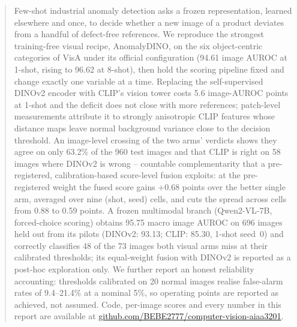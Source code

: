 \begin{abstract}
Few-shot industrial anomaly detection asks a frozen representation, learned elsewhere and
once, to decide whether a new image of a product deviates from a handful of defect-free
references. We reproduce the strongest training-free visual recipe, AnomalyDINO, on the six
object-centric categories of VisA under its official configuration (94.61 image AUROC at
1-shot, rising to 96.62 at 8-shot), then hold the scoring pipeline fixed and change exactly
one variable at a time. Replacing the self-supervised DINOv2 encoder with CLIP's vision tower
costs 5.6 image-AUROC points at 1-shot and the deficit does not close with more references;
patch-level measurements attribute it to strongly anisotropic CLIP features whose distance
maps leave normal background variance close to the decision threshold. An image-level
crossing of the two arms' verdicts shows they agree on only 63.2\% of the 960 test images and
that CLIP is right on 58 images where DINOv2 is wrong -- countable complementarity that a
pre-registered, calibration-based score-level fusion exploits: at the pre-registered weight
the fused score gains $+0.68$ points over the better single arm, averaged over nine
(shot, seed) cells, and cuts the spread across cells from 0.88 to 0.59 points. A frozen
multimodal branch (Qwen2-VL-7B, forced-choice scoring) obtains 95.75 macro image AUROC
on 696 images held out from its pilots (DINOv2: 93.13; CLIP: 85.30, 1-shot seed~0)
and correctly classifies 48 of the 73 images both visual arms miss at their calibrated thresholds; its equal-weight fusion with DINOv2 is reported as a post-hoc
exploration only. We further report an honest reliability accounting:
thresholds calibrated on 20 normal images realise false-alarm rates of 9.4--21.4\% at a
nominal 5\%, so operating points are reported as achieved, not assumed. Code, per-image
scores and every number in this report are available at
\url{github.com/BEBE2777/computer-vision-aiaa3201}.
\end{abstract}
